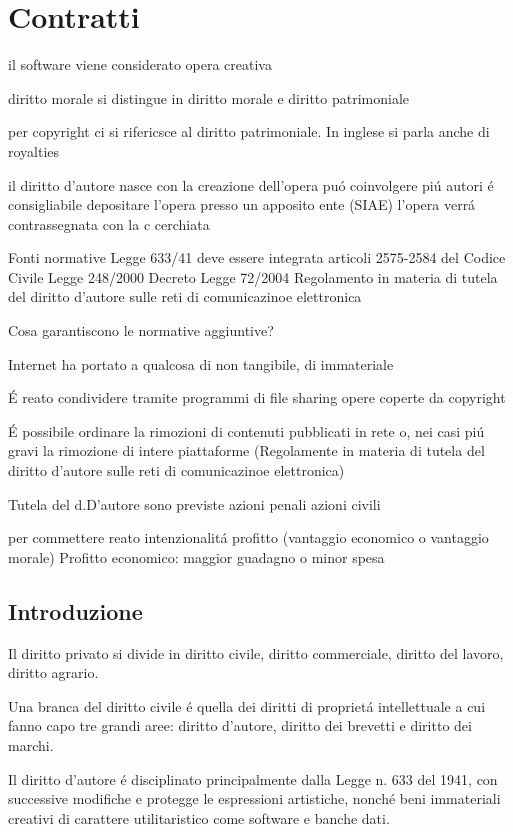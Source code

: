 \documentclass{article}
\begin{document}
\section{Contratti}

il software viene considerato opera creativa

diritto morale si distingue in diritto morale e diritto patrimoniale

per copyright ci si rifericsce al diritto patrimoniale. In inglese si parla anche di royalties

il diritto d'autore nasce con la creazione dell'opera
pu\'o coinvolgere pi\'u autori
\'e consigliabile depositare l'opera presso un apposito ente (SIAE)
l'opera verr\'a contrassegnata con la c cerchiata

Fonti normative
Legge 633/41 deve essere integrata
articoli 2575-2584 del Codice Civile
Legge 248/2000
Decreto Legge 72/2004
Regolamento in materia di tutela del diritto d'autore sulle reti di comunicazinoe elettronica

Cosa garantiscono le normative aggiuntive?

Internet ha portato a qualcosa di non tangibile, di immateriale

\'E reato condividere tramite programmi di file sharing opere coperte da copyright

\'E possibile ordinare la rimozioni di contenuti pubblicati in rete o, nei casi pi\'u gravi la rimozione di intere piattaforme
(Regolamente in materia di tutela del diritto d'autore sulle reti di comunicazinoe elettronica)

Tutela del d.D'autore
sono previste
azioni penali
azioni civili

per commettere reato
intenzionalit\'a
profitto (vantaggio economico o vantaggio morale)
Profitto economico: maggior guadagno o minor spesa

\subsection{Introduzione}
Il diritto privato si divide in diritto civile, diritto commerciale, diritto del lavoro, diritto agrario.

Una branca del diritto civile \'e quella dei diritti di propriet\'a intellettuale a cui fanno capo tre grandi aree: diritto d'autore, diritto dei brevetti e diritto dei marchi.

Il diritto d'autore \'e disciplinato principalmente dalla Legge n. 633 del 1941, con successive modifiche e protegge le espressioni artistiche, nonch\'e beni immateriali creativi di carattere utilitaristico come software e banche dati.
\end{document}

